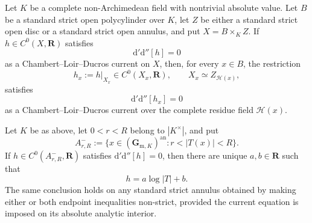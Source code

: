 
\begin{proposition}\label{prop:p062-product-fibre-zero-current-candidate}
Let \(K\) be a complete non-Archimedean field with nontrivial absolute
value. Let \(B\) be a standard strict open polycylinder over \(K\), let
\(Z\) be either a standard strict open disc or a standard strict open
annulus, and put \(X=B\times_K Z\). If
\(h\in C^0(X,\mathbf R)\) satisfies
\begin{equation}\label{eq:p062-product-zero-current-candidate}
                    \mathrm d'\mathrm d''[h]=0
\end{equation}
as a Chambert--Loir--Ducros current on \(X\), then, for every \(x\in B\),
the restriction
\[
       h_x:=h|_{X_x}\in C^0(X_x,\mathbf R),
       \qquad X_x\simeq Z_{\mathscr H(x)},
\]
satisfies
\begin{equation}\label{eq:p062-fibre-zero-current-candidate}
             \mathrm d'\mathrm d''[h_x]=0
\end{equation}
as a Chambert--Loir--Ducros current over the complete residue field
\(\mathscr H(x)\).
\end{proposition}

\begin{proposition}\label{prop:p062-arbitrary-field-annulus-candidate}
Let \(K\) be as above, let \(0<r<R\) belong to \(|K^\times|\), and put
\[
 A^-_{r,R}:=\{x\in(\mathbf G_{\mathrm m,K})^{\mathrm{an}}:
                         r<|T(x)|<R\}.
\]
If \(h\in C^0(A^-_{r,R},\mathbf R)\) satisfies
\(
 \mathrm d'\mathrm d''[h]=0
\), then there are unique \(a,b\in\mathbf R\) such that
\begin{equation}\label{eq:p062-annulus-affine-candidate}
                         h=a\log|T|+b.
\end{equation}
The same conclusion holds on any standard strict annulus obtained by
making either or both endpoint inequalities non-strict, provided the
current equation is imposed on its absolute analytic interior.
\end{proposition}

